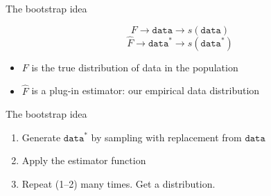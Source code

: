 \documentclass{beamer}
\begin{document}

\begin{frame}{The bootstrap idea}

$$F\rightarrow \texttt{data} \rightarrow s(\texttt{data})$$ \pause
$$\hat{F}\rightarrow \texttt{data}^* \rightarrow s(\texttt{data}^*)$$ \pause

\begin{itemize}
\item $F$ is the true distribution of data in the population
\item $\hat{F}$ is a plug-in estimator: our empirical data distribution
\end{itemize}

\end{frame}

\begin{frame}{The bootstrap idea}

\begin{enumerate}
\item Generate $\texttt{data}^*$ by sampling with replacement from $\texttt{data}$
\item Apply the estimator function
\item Repeat (1--2) many times. Get a distribution.
\end{enumerate}

\end{frame}
\end{document}
